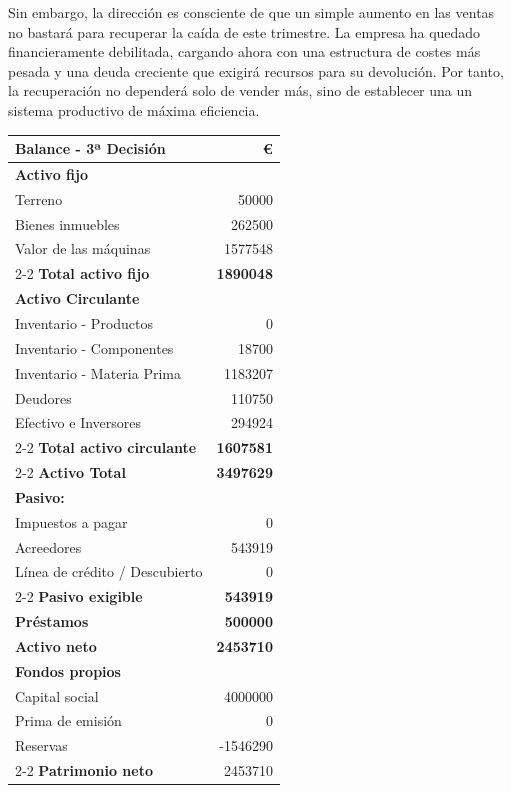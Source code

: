 Sin embargo, la dirección es consciente de que un simple aumento en las ventas no bastará para recuperar la caída de este trimestre. La empresa ha quedado financieramente debilitada, cargando ahora con una estructura de costes más pesada y una deuda creciente que exigirá recursos para su devolución. Por tanto, la recuperación no dependerá solo de vender más, sino de establecer una un sistema productivo de máxima eficiencia.  

\begin{table}[h]
    \centering
    \begin{tabular}{lr}
        \textbf{Balance - 3ª Decisión}               & \textbf{€} \\
        \hline
        \textbf{Activo fijo}                & \\
        Terreno                             & 50000 \\
        Bienes inmuebles                    & 262500 \\
        Valor de las máquinas               & 1577548 \\
        \cline{2-2}
        \textbf{Total activo fijo}          & \textbf{1890048} \\
        \textbf{Activo Circulante}          & \\
        Inventario - Productos              & 0 \\
        Inventario - Componentes            & 18700 \\
        Inventario - Materia Prima          & 1183207 \\
        Deudores                            & 110750 \\
        Efectivo e Inversores               & 294924 \\
        \cline{2-2}
        \textbf{Total activo circulante}    & \textbf{1607581} \\
        \cline{2-2}
        \textbf{Activo Total}               & \textbf{3497629} \\
        \textbf{Pasivo:}                    & \\
        Impuestos a pagar                   & 0 \\
        Acreedores                          & 543919 \\
        Línea de crédito / Descubierto      & 0 \\
        \cline{2-2}
        \textbf{Pasivo exigible}            & \textbf{543919} \\
        \textbf{Préstamos}                  & \textbf{500000} \\
        \textbf{Activo neto}                & \textbf{2453710} \\
        \textbf{Fondos propios}             & \\
        Capital social                      & 4000000 \\
        Prima de emisión                    & 0 \\
        Reservas                            & -1546290 \\
        \cline{2-2}
        \textbf{Patrimonio neto}            & 2453710 
    \end{tabular}
\end{table}

